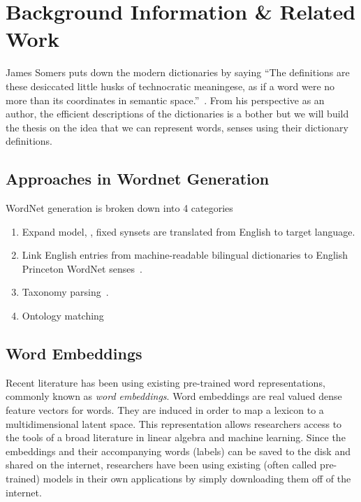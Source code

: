 
\chapter{Background Information \& Related Work}\label{chap:background_n_related}

James Somers puts down the modern dictionaries by saying \enquote{The definitions are these desiccated little husks of technocratic meaningese, as if a word were no more than its coordinates in semantic space.}~\cite{somers_youre_2014}.
From his perspective as an author, the efficient descriptions of the dictionaries is a bother but we will build the thesis on the idea that we can represent words, senses using their dictionary definitions.


\section{Approaches in Wordnet Generation}%
\label{sec:approaches_in_wordnet_generation}

WordNet generation is broken down into 4 categories
\begin{enumerate}
    \item Expand model, \textcite{vossen_introduction_1998}, fixed synsets are translated from English to target language.
    \item Link English entries from machine-readable bilingual dictionaries to English Princeton WordNet senses~\textcite{knight_building_1994}.
    \item Taxonomy parsing~\textcite{farreres_using_1998}.
    \item Ontology matching~\textcite{farreres_towards_2004}
\end{enumerate}

\section{Word Embeddings}%
\label{sec:word_embeddings}

Recent literature has been using existing pre-trained word representations, commonly known as \emph{word embeddings}.
Word embeddings are real valued dense feature vectors for words.
They are induced in order to map a lexicon to a multidimensional latent space.
This representation allows researchers access to the tools of a broad literature in linear algebra and machine learning.
Since the embeddings and their accompanying words (labels) can be saved to the disk and shared on the internet, researchers have been using existing (often called pre-trained) models in their own applications by simply downloading them off of the internet.


